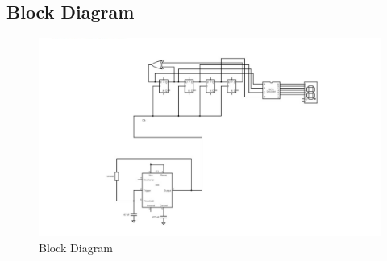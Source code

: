 \documentclass[journal,12pt,twocolumn]{IEEEtran}
\begin{document}
\begin{enumerate}
\section{Block Diagram}
\begin{figure}[h]
\begin{center}
		\includegraphics[width= 2\linewidth]{images/fig8.png}
		\caption{Block Diagram}
		\label{Block Diagram}
		\end{center}
	\end{figure}
	
\end{enumerate}
\end{document}
